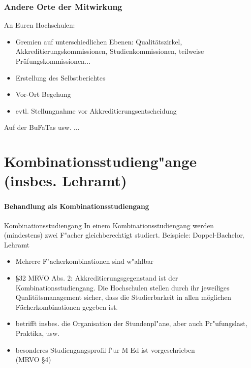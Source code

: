 \documentclass[german,10pt,xcolor=colortbl,compress]{beamer}
\begin{document}
\begin{frame}
\frametitle{Andere Orte der Mitwirkung}
An Euren Hochschulen:
\begin{itemize}
\item Gremien auf unterschiedlichen Ebenen: Qualitätszirkel, Akkreditierungskommissionen, Studienkommissionen, teilweise Prüfungskommissionen...
\item Erstellung des Selbstberichtes
\item Vor-Ort Begehung
\item evtl. Stellungnahme vor Akkreditierungsentscheidung
\end{itemize}
\vspace*{0.5cm}
Auf der BuFaTas usw. ...
\end{frame}
\section[Kombinationsstudieng"ange]{Kombinationsstudieng"ange (insbes. Lehramt)}

\begin{frame}
\frametitle{\insertsection}
\framesubtitle{Behandlung als Kombinationsstudiengang}
\begin{block}{Kombinationsstudiengang}
	In einem Kombinationsstudiengang werden (mindestens) zwei F"acher gleichberechtigt studiert. Beispiele: \glqq Doppel-Bachelor\grqq, Lehramt
\end{block}
\pause
\begin{itemize}
	\item Mehrere F"acherkombinationen sind w"ahlbar
	\item \S 32 MRVO Abs. 2: Akkreditierungsgegenstand ist der Kombinationsstudiengang. Die Hochschulen stellen durch ihr jeweiliges Qualitätsmanagement sicher, dass die Studierbarkeit in allen möglichen Fächerkombinationen gegeben ist. 
	\item betrifft insbes. die Organisation der Stundenpl"ane, aber auch Pr"ufungslast, Praktika, usw.
	\item besonderes Studiengangsprofil f"ur M Ed ist vorgeschrieben\\(MRVO \S 4)
\end{itemize}
\end{frame}
\end{document}
